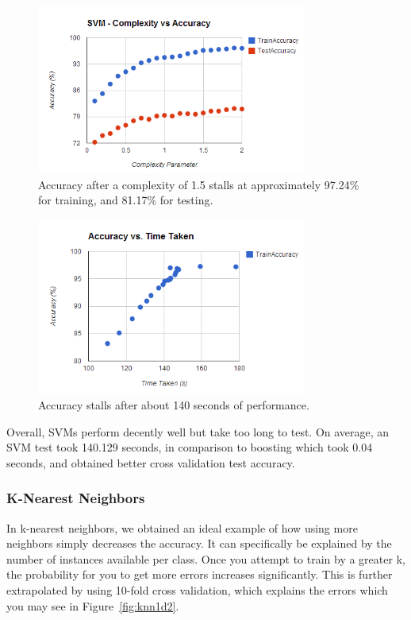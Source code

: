 \documentclass[annual]{acmsiggraph}
\begin{document}
\begin{figure}[ht]
  \centering
  \includegraphics[width=3.5in]{charts/chart_1_svm_d2.PNG}
  \caption{Accuracy after a complexity of 1.5 stalls at approximately 97.24\% 
  for training, and 81.17\% for testing.}
  \label{fig:svm1d2}
\end{figure}

\begin{figure}[ht]
  \centering
  \includegraphics[width=3.5in]{charts/chart_2_svm_d2.PNG}
  \caption{Accuracy stalls after about 140 seconds of performance.}
  \label{fig:svm2d2}
\end{figure}

Overall, SVMs perform decently well but take too long to test. On average, an
SVM test took 140.129 seconds, in comparison to boosting which took 0.04 seconds,
and obtained better cross validation test accuracy.

\subsubsection{K-Nearest Neighbors}

In k-nearest neighbors, we obtained an ideal example of how using more neighbors
simply decreases the accuracy. It can specifically be explained by the number
of instances available per class. Once you attempt to train by a greater k, the
probability for you to get more errors increases significantly. This is further
extrapolated by using 10-fold cross validation, which explains the errors which 
you may see in Figure~\ref{fig:knn1d2}.
\end{document}
